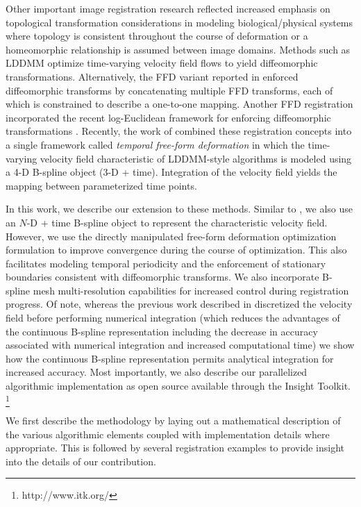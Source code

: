 \documentclass{llncs}
\begin{document}
Other important image registration research
reflected increased emphasis on topological transformation considerations
in modeling biological/physical systems where topology is 
consistent throughout the course of deformation or a 
homeomorphic relationship is assumed between image domains.
Methods such as LDDMM \cite{beg2005} optimize time-varying velocity field 
flows to yield diffeomorphic transformations.  Alternatively, the FFD 
variant reported in \cite{rueckert2006} enforced diffeomorphic transforms
by concatenating multiple FFD transforms, each of which is constrained
to describe a one-to-one mapping.  Another FFD registration
incorporated the recent log-Euclidean framework for enforcing diffeomorphic
transformations \cite{Modat2011}.
Recently, the work of 
\cite{de-craene2011} combined these registration concepts into a single
framework called {\em temporal free-form deformation} in which the 
time-varying velocity field characteristic of LDDMM-style algorithms
is modeled using a 4-D B-spline object (3-D + time).  Integration of 
the velocity field yields the mapping between parameterized time points.

In this work, we describe our extension to these methods.  Similar to 
\cite{de-craene2011}, we also use an $N$-D + time B-spline object to 
represent the characteristic velocity field.  However, we use the 
directly manipulated free-form deformation optimization formulation to improve 
convergence during the course of optimization.  This also facilitates
modeling temporal periodicity and
the enforcement of stationary boundaries consistent with diffeomorphic
transforms.
We also incorporate B-spline mesh multi-resolution capabilities
for increased control during registration progress.  Of note, whereas the 
previous work described in \cite{de-craene2011} discretized the velocity field before 
performing numerical integration (which reduces the advantages of the continuous
B-spline representation including the decrease in accuracy associated with
numerical integration and increased computational time) we show how the continuous B-spline 
representation permits analytical integration for increased accuracy.  
Most importantly, we also describe
our parallelized algorithmic implementation as open source available through the Insight Toolkit.%
\footnote{
http://www.itk.org/
}

We first describe the methodology by laying out a mathematical description 
of the various algorithmic elements coupled with implementation details
where appropriate.  This is followed by several registration examples
to provide insight into the details of our contribution. 
\end{document}
